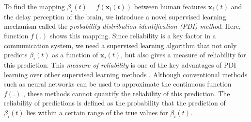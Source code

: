 \documentclass[journal,draftclsnofoot,onecolumn,12pt]{IEEEtran}%
\newcommand{\xb}{\boldsymbol{x}}
\begin{document}
	
	{To find the mapping $\beta_i(t)=f(\xb_i(t))$ between human features $\xb_i(t)$ and the delay perception of the brain, we introduce a novel supervised learning mechanism called the \emph{probability distribution identification (PDI) method}. Here, function $f(.)$ shows this mapping. Since reliability is a key factor in a communication system, we need a supervised learning algorithm that not only predicts $\beta_i(t)$ as a function of $\xb_i(t)$, but also gives a measure of reliability for this prediction. This \emph{measure of reliability} is one of the key advantages of PDI learning over other supervised learning methods \cite{bishop2007pattern, chen2017machine}.} Although conventional methods such as neural networks can be used to approximate the continuous function $f(.)$ \cite{chen2017machine}, these methods cannot quantify the reliability of this prediction.  The reliability of predictions is defined as the probability that the prediction of $\beta_i(t)$ lies within a certain range of the true values for $\beta_i(t)$.
	
\end{document}
